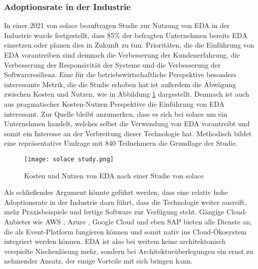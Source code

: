 \subsubsection*{Adoptionsrate in der Industrie}
In einer 2021 von solace beauftragen Studie zur Nutzung von \ac{EDA} in der Industrie wurde festgestellt, dass 85\% der befragten Unternehmen bereits \ac{EDA} einsetzen oder planen dies in Zukunft zu tun. Prioritäten, die die Einführung von \ac{EDA} vorantreiben sind demnach die Verbesserung der Kundenerfahrung, die Verbesserung der Responsivität der Systeme und die Verbesserung der Softwareresilienz. \cite[Vgl.][]{solace2021} Eine für die betriebswirtschaftliche Perspektive besonders interessante Metrik, die die Studie erhoben hat ist außerdem die Abwägung zwischen Kosten und Nutzen, wie in Abbildung \ref{solace} dargestellt. Demnach ist auch aus pragmatischer Kosten-Nutzen Perspektive die Einführung von \ac{EDA} interessant. Zur Quelle bleibt anzumerken, dass es sich bei solace um ein Unternehmen handelt, welches selbst die Verwendung von \ac{EDA} vorantreibt und somit ein Interesse an der Verbreitung dieser Technologie hat.  Methodisch bildet eine repräsentative Umfrage mit 840 Teilnehmern die Grundlage der Studie.
\begin{figure}
    \centering
    \texttt{[image: solace study.png]}
    \caption[Kosten und Nutzen von EDA nach einer Studie von solace]{Kosten und Nutzen von EDA nach einer Studie von solace \cite[Vgl.][]{solace2021}}
    \label{solace}
  \end{figure}
Als schließendes Argument könnte geführt werden, dass eine relativ hohe Adoptionsrate in der Industrie dazu führt, dass die Technologie weiter ausreift, mehr Praxisbeispiele und fertige Software zur Verfügung steht. Gängige Cloud-Anbieter wie AWS \cite[Vgl.][]{aws2023}, Azure \cite[Vgl.][]{azure2023}, Google Cloud \cite[Vgl.][]{gcp2021} und eben SAP bieten alle Dienste an, die als Event-Platform fungieren können und somit nativ ins Cloud-Ökosystem integriert werden können. \ac*{EDA} ist also bei weitem keine architektonisch verspielte Nischenlösung mehr, sondern bei Architekturüberlegungen ein ernst zu nehmender Ansatz, der einige Vorteile mit sich bringen kann.